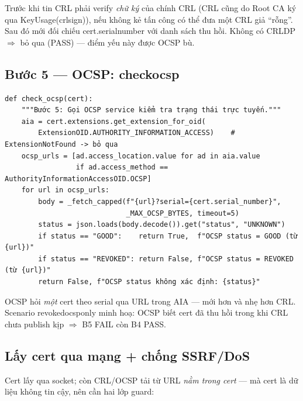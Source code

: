 \documentclass[12pt,a4paper]{article}
\newcommand{\code}[1]{{\ttfamily\small\def\_{\textunderscore\discretionary{}{}{}}#1}}
\begin{document}
Trước khi tin CRL phải verify \emph{chữ ký} của chính CRL (CRL cũng do Root CA ký
qua \code{KeyUsage(crl\_sign)}), nếu không kẻ tấn công có thể đưa một CRL giả
``rỗng''. Sau đó mới đối chiếu \code{cert.serial\_number} với danh sách thu hồi.
Không có CRLDP $\Rightarrow$ bỏ qua (PASS) --- điểm yếu này được OCSP bù.

\subsection{Bước 5 --- OCSP: \code{check\_ocsp}}

\begin{Verbatim}
def check_ocsp(cert):
    """Bước 5: Gọi OCSP service kiểm tra trạng thái trực tuyến."""
    aia = cert.extensions.get_extension_for_oid(
        ExtensionOID.AUTHORITY_INFORMATION_ACCESS)    # ExtensionNotFound -> bỏ qua
    ocsp_urls = [ad.access_location.value for ad in aia.value
                 if ad.access_method == AuthorityInformationAccessOID.OCSP]
    for url in ocsp_urls:
        body = _fetch_capped(f"{url}?serial={cert.serial_number}",
                             _MAX_OCSP_BYTES, timeout=5)
        status = json.loads(body.decode()).get("status", "UNKNOWN")
        if status == "GOOD":    return True,  f"OCSP status = GOOD (từ {url})"
        if status == "REVOKED": return False, f"OCSP status = REVOKED (từ {url})"
        return False, f"OCSP status không xác định: {status}"
\end{Verbatim}

OCSP hỏi \emph{một} cert theo serial qua URL trong AIA --- mới hơn và nhẹ hơn CRL.
Scenario \code{revoked\_ocsp\_only} minh hoạ: OCSP biết cert đã thu hồi trong khi
CRL chưa publish kịp $\Rightarrow$ B5 FAIL còn B4 PASS.

\subsection{Lấy cert qua mạng + chống SSRF/DoS}

Cert lấy qua socket; còn CRL/OCSP tải từ URL \emph{nằm trong cert} --- mà cert là
dữ liệu không tin cậy, nên cần hai lớp guard:
\end{document}
